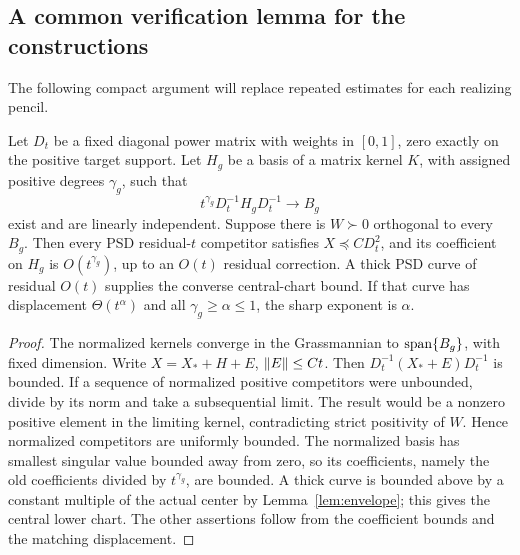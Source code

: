 \subsection{A common verification lemma for the constructions}
The following compact argument will replace repeated estimates for each realizing pencil.
\begin{lemma}\label{lem:realization}
Let $D_t$ be a fixed diagonal power matrix with weights in $[0,1]$, zero exactly on the positive target support. Let $H_g$ be a basis of a matrix kernel $K$, with assigned positive degrees $\gamma_g$, such that
\[
 t^{\gamma_g}D_t^{-1}H_gD_t^{-1}\longrightarrow B_g
\]
exist and are linearly independent. Suppose there is $W\succ0$ orthogonal to every $B_g$. Then every PSD residual-$t$ competitor satisfies $X\preceq C D_t^2$, and its coefficient on $H_g$ is $O(t^{\gamma_g})$, up to an $O(t)$ residual correction. A thick PSD curve of residual $O(t)$ supplies the converse central-chart bound. If that curve has displacement $\Theta(t^\alpha)$ and all $\gamma_g\ge\alpha\le1$, the sharp exponent is $\alpha$.
\end{lemma}
\begin{proof}
The normalized kernels converge in the Grassmannian to $\operatorname{span}\{B_g\}$, with fixed dimension. Write $X=X_*+H+E$, $\lVert E\rVert\le Ct$. Then $D_t^{-1}(X_*+E)D_t^{-1}$ is bounded. If a sequence of normalized positive competitors were unbounded, divide by its norm and take a subsequential limit. The result would be a nonzero positive element in the limiting kernel, contradicting strict positivity of $W$. Hence normalized competitors are uniformly bounded. The normalized basis has smallest singular value bounded away from zero, so its coefficients, namely the old coefficients divided by $t^{\gamma_g}$, are bounded. A thick curve is bounded above by a constant multiple of the actual center by Lemma~\ref{lem:envelope}; this gives the central lower chart. The other assertions follow from the coefficient bounds and the matching displacement.
\end{proof}
